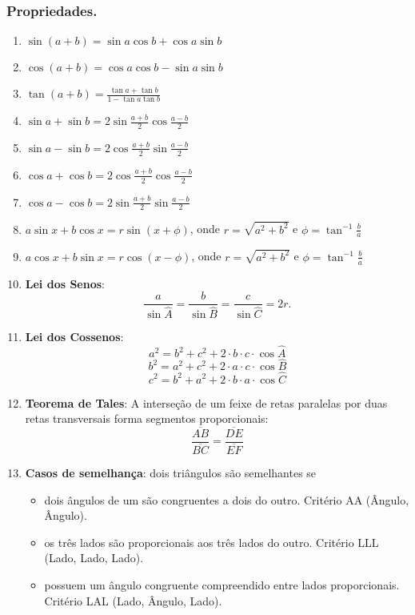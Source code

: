 \subsubsection*{Propriedades.}
\begin{multicols}{2}
	\begin{enumerate}
		\item $\sin(a+b) = \sin a \cos b + \cos a \sin b$
		\item $\cos(a+b) = \cos a \cos b - \sin a \sin b$
		\item $\tan(a+b) = \frac{\tan a + \tan b}{1 - \tan a \tan b}$
		\item $\sin a + \sin b = 2\sin\frac{a+b}{2}\cos\frac{a-b}{2}$
		\item $\sin a - \sin b = 2\cos\frac{a+b}{2}\sin\frac{a-b}{2}$
		\item $\cos a + \cos b = 2\cos\frac{a+b}{2}\cos\frac{a-b}{2}$
		\item $\cos a - \cos b = 2\sin\frac{a+b}{2}\sin\frac{a-b}{2}$
		\item $a\sin x+b\cos x = r\sin(x+\phi)$, onde $r=\sqrt{a^2+b^2}$ e $\phi = \tan^{-1}\frac{b}{a}$ 
		\item $a\cos x+b\sin x = r\cos(x-\phi)$, onde $r=\sqrt{a^2+b^2}$ e $\phi = \tan^{-1}\frac{b}{a}$
		\item \textbf{Lei dos Senos}: $$\frac{a}{\sin \hat{A}} = \frac{b}{\sin \hat{B}} = \frac{c}{\sin \hat{C}} = 2r.$$
		\item \textbf{Lei dos Cossenos}:
		$$a^2 = b^2 +c^2+2\cdot b\cdot c\cdot\cos\hat{A}$$
		$$b^2 = a^2 +c^2+2\cdot a\cdot c\cdot\cos\hat{B}$$
		$$c^2 = b^2 +a^2+2\cdot b\cdot a\cdot\cos\hat{C}$$
		\item \textbf{Teorema de Tales}: A interseção de um feixe de retas paralelas por duas retas transversais forma segmentos proporcionais:
		$$\frac{\overline{AB}}{\overline{BC}} = \frac{\overline{DE}}{\overline{EF}}$$
		\item \textbf{Casos de semelhança}: dois triângulos são semelhantes se
		\begin{itemize}
			\item dois ângulos de um são congruentes a dois do outro. Critério AA (Ângulo, Ângulo).
			\item os três lados são proporcionais aos três lados do outro. Critério LLL (Lado, Lado, Lado).
			\item possuem um ângulo congruente compreendido entre lados proporcionais. Critério LAL (Lado, Ângulo, Lado).
		\end{itemize}

	\end{enumerate}
\end{multicols}

